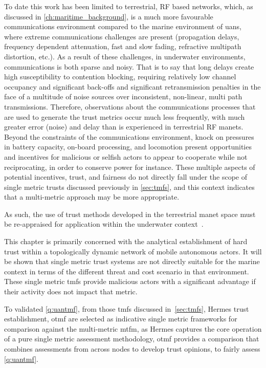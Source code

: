 To date this work has been limited to terrestrial, RF based networks, which, as discussed in \autoref{ch:maritime_background}, is a much more favourable communications environment compared to the marine environment of \glspl{uan}, where extreme communications challenges are present (propagation delays, frequency dependent attenuation, fast and slow fading, refractive multipath distortion, etc.).
As a result of these challenges, in underwater environments, communications is both sparse and noisy.
That is to say that long delays create high susceptibility to contention blocking, requiring relatively low channel occupancy and significant back-offs and significant retransmission penalties in the face of a multitude of noise sources over inconsistent, non-linear, multi path transmissions.
Therefore, observations about the communications processes that are used to generate the trust metrics occur much less frequently, with much greater error (noise) and delay than is experienced in terrestrial RF \glspl{manet}.
Beyond the constraints of the communications environment, knock on pressures in battery capacity, on-board processing, and locomotion present opportunities and incentives for malicious or selfish actors to appear to cooperate while not reciprocating, in order to conserve power for instance.
These multiple aspects of potential incentives, trust, and fairness do not directly fall under the scope of single metric trusts discussed previously in \autoref{sec:tmfs}, and this context indicates that a multi-metric approach may be more appropriate.

As such, the use of trust methods developed in the terrestrial \gls{manet} space must be re-appraised for application within the underwater context~\cite{Pavan2015}.

This chapter is primarily concerned with the analytical establishment of hard trust within a topologically dynamic network of mobile autonomous actors.
It will be shown that single metric trust systems are not directly suitable for the marine context in terms of the different threat and cost scenario in that environment.
These single metric \glspl{tmf} provide malicious actors with a significant advantage if their activity does not impact that metric.

To validated \ref{q:uantmf}, from those \glspl{tmf} discussed in~\autoref{sec:tmfs}, Hermes trust establishment, \gls{otmf} are selected as indicative single metric frameworks for comparison against the multi-metric \gls{mtfm}, as Hermes captures the core operation of a pure single metric assessment methodology, \gls{otmf} provides a comparison that combines assessments from across nodes to develop trust opinions, to fairly assess \ref{q:uantmf}.


